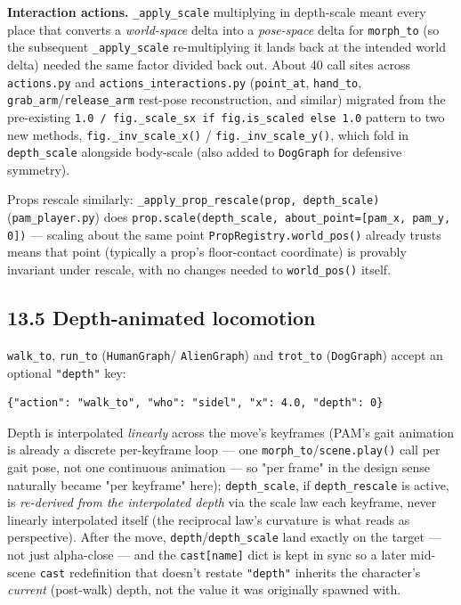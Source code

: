 \documentclass[
  12pt,
  letterpaper,
]{book}
\begin{document}
\textbf{Interaction actions.} \texttt{\_apply\_scale} multiplying in
depth-scale meant every place that converts a \emph{world-space} delta
into a \emph{pose-space} delta for \texttt{morph\_to} (so the
subsequent \texttt{\_apply\_scale} re-multiplying it lands back at the
intended world delta) needed the same factor divided back out. About
40 call sites across \texttt{actions.py} and
\texttt{actions\_interactions.py} (\texttt{point\_at},
\texttt{hand\_to}, \texttt{grab\_arm}/\texttt{release\_arm} rest-pose
reconstruction, and similar) migrated from the pre-existing
\texttt{1.0 / fig.\_scale\_sx if fig.is\_scaled else 1.0} pattern to
two new methods, \texttt{fig.\_inv\_scale\_x()} /
\texttt{fig.\_inv\_scale\_y()}, which fold in \texttt{depth\_scale}
alongside body-scale (also added to \texttt{DogGraph} for defensive
symmetry).

Props rescale similarly: \texttt{\_apply\_prop\_rescale(prop,
depth\_scale)} (\texttt{pam\_player.py}) does
\texttt{prop.scale(depth\_scale, about\_point=[pam\_x, pam\_y, 0])}
--- scaling about the same point \texttt{PropRegistry.world\_pos()}
already trusts means that point (typically a prop's floor-contact
coordinate) is provably invariant under rescale, with no changes
needed to \texttt{world\_pos()} itself.

\subsection{\texorpdfstring{13.5 Depth-animated locomotion}{13.5 Depth-animated locomotion}}\label{depth-animated-locomotion}

\texttt{walk\_to}, \texttt{run\_to} (\texttt{HumanGraph}/
\texttt{AlienGraph}) and \texttt{trot\_to} (\texttt{DogGraph}) accept
an optional \texttt{"depth"} key:

\begin{verbatim}
{"action": "walk_to", "who": "sidel", "x": 4.0, "depth": 0}
\end{verbatim}

Depth is interpolated \emph{linearly} across the move's keyframes
(PAM's gait animation is already a discrete per-keyframe loop --- one
\texttt{morph\_to}/\texttt{scene.play()} call per gait pose, not one
continuous animation --- so "per frame" in the design sense naturally
became "per keyframe" here); \texttt{depth\_scale}, if
\texttt{depth\_rescale} is active, is \emph{re-derived from the
interpolated depth} via the scale law each keyframe, never linearly
interpolated itself (the reciprocal law's curvature is what reads as
perspective). After the move, \texttt{depth}/\texttt{depth\_scale}
land exactly on the target --- not just alpha-close --- and the
\texttt{cast[name]} dict is kept in sync so a later mid-scene
\texttt{cast} redefinition that doesn't restate \texttt{"depth"}
inherits the character's \emph{current} (post-walk) depth, not the
value it was originally spawned with.
\end{document}
